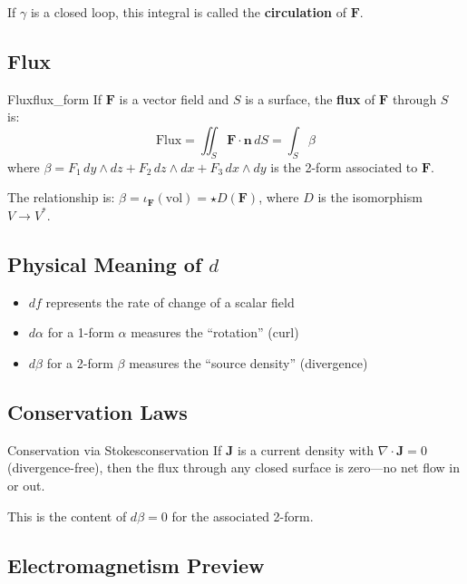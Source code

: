 \documentclass[11pt, letterpaper, openany]{book}
\begin{document}
If $\gamma$ is a closed loop, this integral is called the \textbf{circulation} of $\mathbf{F}$.

\subsection{Flux}

\begin{defn}{Flux}{flux_form}
If $\mathbf{F}$ is a vector field and $S$ is a surface, the \textbf{flux} of $\mathbf{F}$ through $S$ is:
\[\text{Flux} = \iint_S \mathbf{F} \cdot \mathbf{n}\, dS = \int_S \beta\]
where $\beta = F_1\,dy \wedge dz + F_2\,dz \wedge dx + F_3\,dx \wedge dy$ is the 2-form associated to $\mathbf{F}$.
\end{defn}

\begin{remark}
The relationship is: $\beta = \iota_{\mathbf{F}}(\text{vol}) = \star D(\mathbf{F})$, where $D$ is the isomorphism $V \to V^*$.
\end{remark}

\subsection{Physical Meaning of $d$}

\begin{itemize}
    \item $df$ represents the rate of change of a scalar field
    \item $d\alpha$ for a 1-form $\alpha$ measures the ``rotation'' (curl)
    \item $d\beta$ for a 2-form $\beta$ measures the ``source density'' (divergence)
\end{itemize}

\subsection{Conservation Laws}

\begin{thm}{Conservation via Stokes}{conservation}
If $\mathbf{J}$ is a current density with $\nabla \cdot \mathbf{J} = 0$ (divergence-free), then the flux through any closed surface is zero---no net flow in or out.

This is the content of $d\beta = 0$ for the associated 2-form.
\end{thm}

\subsection{Electromagnetism Preview}
\end{document}
